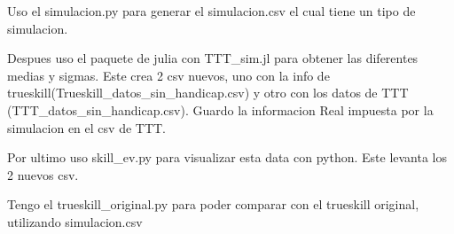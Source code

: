 Uso el simulacion.py para generar el simulacion.csv el cual tiene un tipo de simulacion.

Despues uso el paquete de julia con TTT_sim.jl para obtener las diferentes medias y sigmas.
Este crea 2 csv nuevos, uno con la info de trueskill(Trueskill_datos_sin_handicap.csv) y otro
con los datos de TTT (TTT_datos_sin_handicap.csv).
Guardo la informacion Real impuesta por la simulacion  en el csv de TTT.

Por ultimo uso skill_ev.py para visualizar esta data con python. Este levanta los 2 nuevos csv.

Tengo el trueskill_original.py para poder comparar con el trueskill original, utilizando
simulacion.csv
